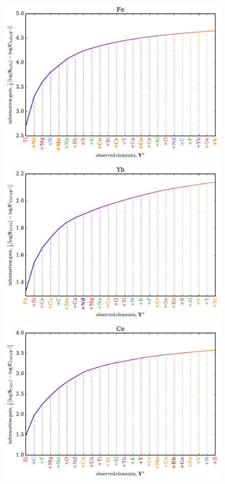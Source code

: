 \documentclass[a4paper,fleqn,usenatbib]{mnras}
\begin{document}
\begin{figure}
	\includegraphics[width=\columnwidth]{apogee_centers_final_29502_spc_win_wid_1p5_fe_inf_gain.pdf}
	\includegraphics[width=\columnwidth]{apogee_centers_final_29502_spc_win_wid_1p5_yb_inf_gain.pdf}
	\includegraphics[width=\columnwidth]{apogee_centers_final_29502_spc_win_wid_1p5_ce_inf_gain.pdf}

\end{figure}
\end{document}
